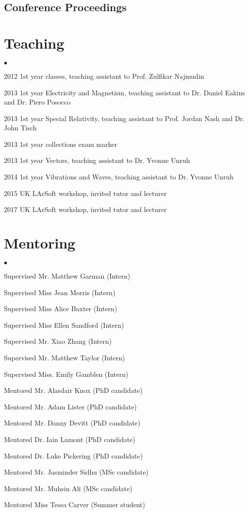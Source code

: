 \documentclass[margin,line]{res}
\newenvironment{list2}{
  \begin{list}{$\bullet$}{%
      \setlength{\itemsep}{0in}
      \setlength{\parsep}{0in} \setlength{\parskip}{0in}
      \setlength{\topsep}{0in} \setlength{\partopsep}{0in} 
      \setlength{\leftmargin}{0.2in}}}{\end{list}}
\begin{document}
\begin{resume}
\begin{refsection}[proceedings]
\section{\sc Conference Proceedings}
\nocite{*}
\printbibliography
\end{refsection}


\section{\sc Teaching }
\begin{list2}
\item 2012 1st year classes, teaching assistant to Prof. Zulfikar Najmudin
\item 2013 1st year Electricity and Magnetism, teaching assistant to Dr. Daniel Eakins and Dr. Piero Posocco
\item 2013 1st year Special Relativity, teaching assistant to Prof. Jordan Nash and Dr. John Tisch
\item 2013 1st year collections exam marker
\item 2013 1st year Vectors, teaching assistant to Dr. Yvonne Unruh
\item 2014 1st year Vibrations and Waves, teaching assistant to Dr. Yvonne Unruh
\item 2015 UK LArSoft workshop, invited tutor and lecturer
\item 2017 UK LArSoft workshop, invited tutor and lecturer
\end{list2}

\section{\sc Mentoring }
\begin{list2}
\item Supervised Mr. Matthew Garman (Intern)
\item Supervised Miss Jean Morris (Intern)
\item Supervised Miss Alice Baxter (Intern)
\item Supervised Miss Ellen Sandford (Intern)
\item Supervised Mr. Xiao Zhang (Intern)
\item Supervised Mr. Matthew Taylor (Intern)
\item Supervised Miss. Emily Gamblen (Intern)
\item Mentored Mr. Alasdair Knox (PhD candidate)
\item Mentored Mr. Adam Lister (PhD candidate)
\item Mentored Mr. Danny Devitt (PhD candidate)
\item Mentored Dr. Iain Lamont (PhD candidate)
\item Mentored Dr. Luke Pickering (PhD candidate)
\item Mentored Mr. Jasminder Sidhu (MSc candidate)
\item Mentored Mr. Muhsin Ali (MSc candidate)
\item Mentored Miss Tessa Carver (Summer student)
\end{list2}




\end{resume}
\end{document}

